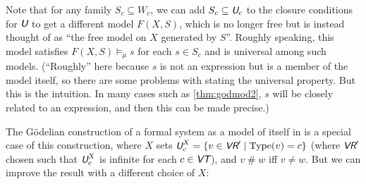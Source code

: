 \documentclass[runningheads,a4paper]{llncs}
\newcommand{\vr}{\textit{\textsf{VR}}} %
\newcommand{\vt}{\textit{\textsf{VT}}} %
\newcommand{\uv}{\textit{\textsf{U}}} %
\newcommand{\type}{{\rm Type}}
\newcommand{\fresh}{\mathbin{\#}}
\begin{document}
\begin{remark}\label{rem:modcls}
Note that for any family $S_c\subseteq W_c$, we can add $S_c\subseteq\uv_c$ to the closure conditions for $\uv$ to get a different model $F(X, S)$, which is no longer free but is instead thought of as ``the free model on $X$ generated by $S$''. Roughly speaking, this model satisfies $F(X, S)\models_\mu s$ for each $s\in S_c$ and is universal among such models. (``Roughly'' here because $s$ is not an expression but is a member of the model itself, so there are some problems with stating the universal property. But this is the intuition. In many cases such as \autoref{thm:godmod2}, $s$ will be closely related to an expression, and then this can be made precise.)
\end{remark}                                              

The G\"{o}delian construction of a formal system as a model of itself in \cite{models} is a special case of this construction, where $X$ sets $\uv^X_c=\{v\in\vr'\mid\type(v)=c\}$ (where $\vr'$ chosen such that $\uv^X_c$ is infinite for each $c\in\vt$), and $v\fresh w$ iff $v\ne w$. But we can improve the result with a different choice of $X$:
\end{document}

